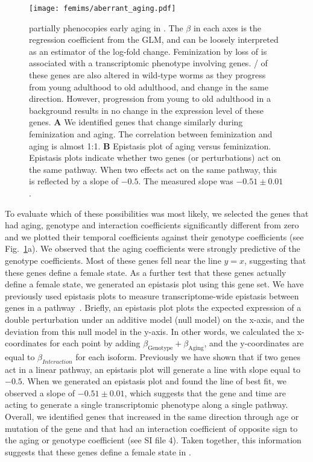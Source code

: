 \begin{figure}
\renewcommand{\familydefault}{\sfdefault}\normalfont{}
\centering
\texttt{[image: femims/aberrant\_aging.pdf]}
\caption{
\fog{} partially phenocopies early aging in \cel{}. The $\beta$ in
each axes is the regression coefficient from the GLM, and can be loosely
interpreted as an estimator of the log-fold change.
Feminization by loss of \fog{} is associated with a transcriptomic phenotype
involving \fogn{} genes. \intersectn{}/\fogn{} of these genes are also altered
in wild-type worms as they progress from young adulthood to old adulthood, and
\coexpressed{} change in the same direction. However, progression from young to
old adulthood in a \fog{} background results in no change in the expression
level of these genes.
\textbf{A} We identified genes that change similarly during feminization and aging.
The correlation between feminization and aging is almost 1:1.
\textbf{B} Epistasis plot of aging versus feminization. Epistasis plots indicate
whether two genes (or perturbations) act on the same pathway. When two effects act
on the same pathway, this is reflected by a slope of $-0.5$. The measured slope
was $-0.51 \pm 0.01$.
}%
\label{fig:aberrant_aging}
\end{figure}

To evaluate which of these possibilities was most likely, we selected
the \intersectn{} genes that had aging, genotype and interaction coefficients
significantly different from zero and we plotted their temporal coefficients
against their genotype coefficients (see Fig.~\ref{fig:aberrant_aging}a). We
observed that the aging coefficients were strongly predictive of the genotype
coefficients. Most of these genes fell near the line $y=x$, suggesting that these
genes define a female state. As a further test that these genes actually define
a female state, we generated an epistasis plot using this gene set. We have
previously used epistasis plots to measure transcriptome-wide epistasis between
genes in a pathway~\citep{}.
Briefly, an epistasis plot plots the expected expression of a double perturbation
under an additive model (null model) on the x-axis, and the deviation from this
null model in the y-axis. In other words, we calculated the x-coordinates for each
point by adding $\beta_\mathrm{Genotype} + \beta_\mathrm{Aging}$, and the
y-coordinates are equal to $\beta_{Interaction}$ for each isoform.
Previously we have shown that if two genes act in a
linear pathway, an epistasis plot will generate a line with slope equal to $-0.5$.
When we generated an epistasis plot and found the line of best fit, we observed
a slope of $-0.51\pm 0.01$, which suggests that the  gene and time
are acting to generate a single transcriptomic phenotype along a single pathway.
Overall, we identified
\femalen{} genes that increased in the same direction through age or mutation
of the \fog{} gene and that had an interaction coefficient of opposite sign to
the aging or genotype coefficient (see SI file 4). Taken together, this
information suggests that these \femalen{} genes define a female state in
\cel{}.

